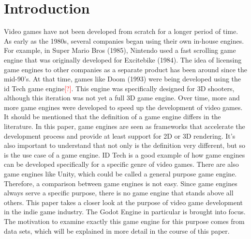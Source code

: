 \section{Introduction}
Video games have not been developed from scratch for a longer period of time.
As early as the 1980s, several companies began using their own in-house engines.
For example, in Super Mario Bros (1985), Nintendo used a fast scrolling game engine that was originally developed for Excitebike (1984)\cite{history-digital-games}.
The idea of licensing game engines to other companies as a separate product has been around since the mid-90's.
At that time, games like Doom (1993) were being developed using the id Tech game engine\textcolor{red}{[?]}.
This engine was specifically designed for 3D shooters, although this iteration was not yet a full 3D game engine.
Over time, more and more game engines were developed to speed up the development of video games.
It should be mentioned that the definition of a game engine differs in the literature.
In this paper, game engines are seen as frameworks that accelerate the development process and provide at least support for 2D or 3D rendering.
It's also important to understand that not only is the definition very different, but so is the use case of a game engine.
ID Tech is a good example of how game engines can be developed specifically for a specific genre of video games.
There are also game engines like Unity, which could be called a general purpose game engine.
Therefore, a comparison between game engines is not easy.
Since game engines always serve a specific purpose, there is no game engine that stands above all others.
This paper takes a closer look at the purpose of video game development in the indie game industry.
The Godot Engine in particular is brought into focus.
The motivation to examine exactly this game engine for this purpose comes from data sets, which will be explained in more detail in the course of this paper.
